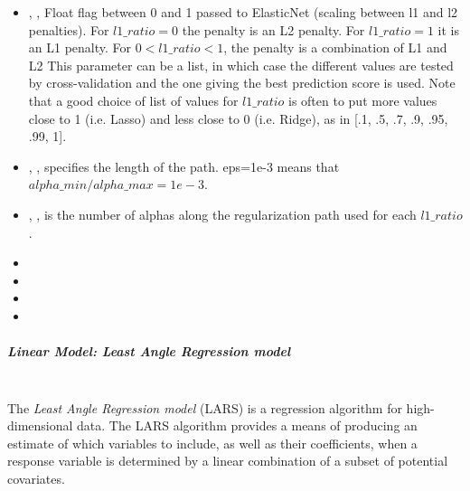 \begin{itemize}
  \item {}, ,
  Float flag between 0 and 1 passed to ElasticNet (scaling between l1 and l2
  penalties).
  For $l1\_ratio = 0$ the penalty is an L2 penalty.
  For $l1\_ratio = 1$ it is an L1 penalty.
  For $0 < l1\_ratio < 1$, the penalty is a combination of L1 and L2 This
  parameter can be a list, in which case the different values are tested by
  cross-validation and the one giving the best prediction score is used.
  Note that a good choice of list of values for $l1\_ratio$ is often to put more
  values close to 1 (i.e. Lasso) and less close to 0 (i.e. Ridge), as in [.1,
  .5, .7, .9, .95, .99, 1].
  \item {}, , specifies the length of
  the path.
  eps=1e-3 means that $alpha\_min / alpha\_max = 1e-3$.
  \item {}, , is the number of
  alphas along the regularization path used for each $l1\_ratio$.
  \item {}
  \item {}
  \item {}
  \item {}
\end{itemize}
\subparagraph{Linear Model: Least Angle Regression model}
\mbox{}
\\The \textit{Least Angle Regression model} (LARS) is a regression algorithm for
high-dimensional data.
%
The LARS algorithm provides a means of producing an estimate of which variables
to include, as well as their coefficients, when a response variable is
determined by a linear combination of a subset of potential covariates.
%


